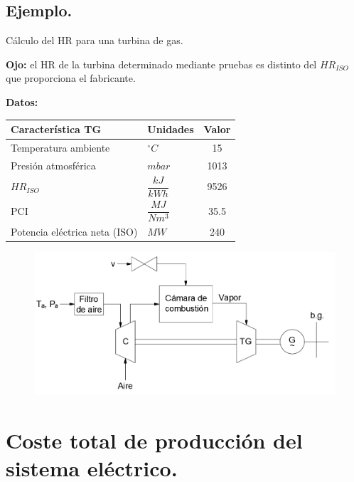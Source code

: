 		\subsection*{Ejemplo.}
			Cálculo del HR para una turbina de gas.
		
		
			\textbf{Ojo:} el HR de la turbina determinado mediante pruebas es distinto del $H\!R_{ISO}$ que proporciona el fabricante.
			
			
			\textbf{Datos:} 
			
			
			\renewcommand{\arraystretch}{1.2}
			\centering
			\begin{tabular}{llc}
				\textbf{Característica TG} & \textbf{Unidades} & \textbf{Valor}\\
				\hline
				Temperatura ambiente & $^\circ C$ & 15\\
				\hline
				Presión atmosférica & $mbar$ & 1013\\
				\hline
				\multirow{2}{*}{$HR_{ISO}$} & \multirow{2}{*}{$\dfrac{kJ}{kWh}$} & \multirow{2}{*}{9526}\\
				&&\\
				\hline
				\multirow{2}{*}{PCI} & \multirow{2}{*}{$\dfrac{MJ}{Nm^3}$} & \multirow{2}{*}{35.5}\\
				&&\\
				\hline
				Potencia eléctrica neta (ISO) & $MW$ & 240
			\end{tabular}
			
			\begin{figure}[H]
				\centering
				\includegraphics[width=0.7\linewidth]{res/tema5/turbinaGas}
				\label{fig:turbinagas}
			\end{figure}
			
	
	\section{Coste total de producción del sistema eléctrico.}
		\subsection{}
	
